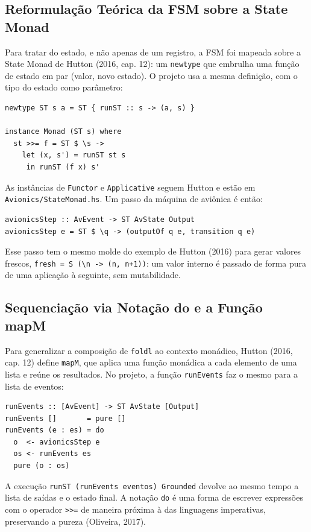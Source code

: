 \documentclass[12pt,a4paper]{article}
\begin{document}
\subsection{Reformulação Teórica da FSM sobre a State Monad}

Para tratar do estado, e não apenas de um registro, a FSM foi mapeada sobre a State Monad de Hutton (2016, cap. 12): um \texttt{newtype} que embrulha uma função de estado em par (valor, novo estado). O projeto usa a mesma definição, com o tipo do estado como parâmetro:

\begin{verbatim}
newtype ST s a = ST { runST :: s -> (a, s) }

instance Monad (ST s) where
  st >>= f = ST $ \s ->
    let (x, s') = runST st s
     in runST (f x) s'
\end{verbatim}

As instâncias de \texttt{Functor} e \texttt{Applicative} seguem Hutton e estão em \texttt{Avionics/StateMonad.hs}. Um passo da máquina de aviônica é então:

\begin{verbatim}
avionicsStep :: AvEvent -> ST AvState Output
avionicsStep e = ST $ \q -> (outputOf q e, transition q e)
\end{verbatim}

Esse passo tem o mesmo molde do exemplo de Hutton (2016) para gerar valores frescos, \texttt{fresh = S (\textbackslash n -> (n, n+1))}: um valor interno é passado de forma pura de uma aplicação à seguinte, sem mutabilidade.

\subsection{Sequenciação via Notação do e a Função mapM}

Para generalizar a composição de \texttt{foldl} ao contexto monádico, Hutton (2016, cap. 12) define \texttt{mapM}, que aplica uma função monádica a cada elemento de uma lista e reúne os resultados. No projeto, a função \texttt{runEvents} faz o mesmo para a lista de eventos:

\begin{verbatim}
runEvents :: [AvEvent] -> ST AvState [Output]
runEvents []       = pure []
runEvents (e : es) = do
  o  <- avionicsStep e
  os <- runEvents es
  pure (o : os)
\end{verbatim}

A execução \texttt{runST (runEvents eventos) Grounded} devolve ao mesmo tempo a lista de saídas e o estado final. A notação \texttt{do} é uma forma de escrever expressões com o operador \texttt{>>=} de maneira próxima à das linguagens imperativas, preservando a pureza (Oliveira, 2017).
\end{document}
